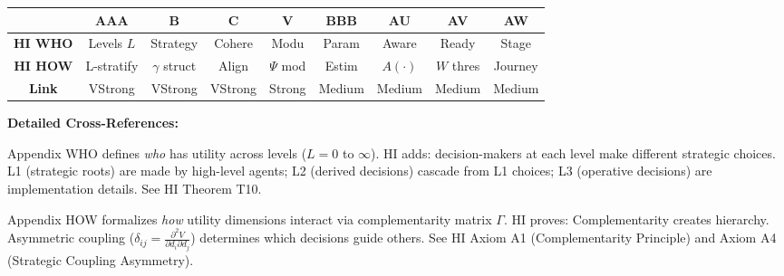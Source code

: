 
\begin{tcolorbox}[colback=white, colframe=black,
    title=\textbf{10C Integration: How HI CORE-HIERARCHY Connects to Other COREs}]

\begin{center}
\small
\begin{tabular}{@{}c|cccccccc@{}}
\toprule
& \textbf{AAA} & \textbf{B} & \textbf{C} & \textbf{V} & \textbf{BBB} & \textbf{AU} & \textbf{AV} & \textbf{AW} \\
\midrule
\textbf{HI \textbf{WHO}} & Levels $L$ & Strategy & Cohere & Modu & Param & Aware & Ready & Stage \\
\textbf{HI \textbf{HOW}} & L-stratify & $\gamma$ struct & Align & $\Psi$ mod & Estim & $A(\cdot)$ & $W$ thres & Journey \\
\midrule
\textbf{Link} & \cellcolor{red!20}VStrong & \cellcolor{red!20}VStrong & \cellcolor{red!20}VStrong & \cellcolor{red!20}Strong & \cellcolor{yellow!20}Medium & \cellcolor{yellow!20}Medium & \cellcolor{yellow!20}Medium & \cellcolor{yellow!20}Medium \\
\bottomrule
\end{tabular}
\end{center}

\textbf{Detailed Cross-References:}

\begin{description}[style=nextline, labelindent=0pt, leftmargin=1.5cm]

\item[\textbf{AAA (CORE-WHO)}]
Appendix WHO defines \textit{who} has utility across levels ($L=0$ to $\infty$). HI adds: decision-makers at each level make different strategic choices. L1 (strategic roots) are made by high-level agents; L2 (derived decisions) cascade from L1 choices; L3 (operative decisions) are implementation details. See HI Theorem T10.

\item[\textbf{B (CORE-HOW)}]
Appendix HOW formalizes \textit{how} utility dimensions interact via complementarity matrix $\Gamma$. HI proves: Complementarity creates hierarchy. Asymmetric coupling ($\delta_{ij} = \frac{\partial^2 V}{\partial d_i \partial d_j}$) determines which decisions guide others. See HI Axiom A1 (Complementarity Principle) and Axiom A4 (Strategic Coupling Asymmetry).


\end{description}
\end{tcolorbox}

